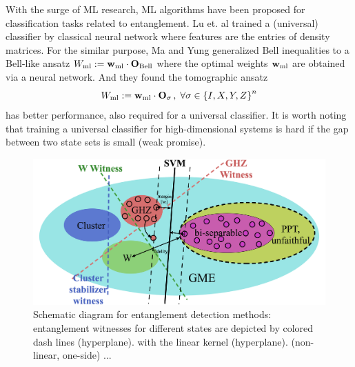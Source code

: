 \documentclass[
aps,
pra,
twocolumn,
floatfix,
]{revtex4-2}
\theoremstyle{plain}
\theoremstyle{definition}
\newcommand{\ew}{W}
\newcommand{\pob}{O}
\newcommand{\ml}{\text{ml}}
\newcommand{\bellineq}{\textup{Bell}}
\newcommand{\sx}{\hat{\sigma}_x}
\newcommand{\sy}{\hat{\sigma}_y}
\newcommand{\sz}{\hat{\sigma}_z}
\begin{document}
With the surge of ML research, ML algorithms have been proposed for classification tasks related to entanglement.
Lu et. al \cite{luSeparabilityEntanglementClassifierMachine2018} 
trained a (universal)  classifier by classical neural network
where features are the entries of density matrices.
For the similar purpose, Ma and Yung \cite{maTransformingBellInequalities2018} generalized Bell inequalities to a Bell-like ansatz $\ew_{\ml}:=\vbw_{\ml}\cdot\vb{\pob}_{\bellineq}$ where the optimal weights $\vbw_{\ml}$ are obtained via a neural network.
And they found the tomographic ansatz
\begin{equation}
	\ew_{\ml} := 
	\vbw_{\ml} \cdot \vb{\pob}_{\sigma} \, , \; \forall \sigma \in  \qty{I,X,Y,Z}^n
	\label{eq:tomographic_ansatz}
\end{equation}
has better performance, 
also required \cite{luTomographyNecessaryUniversal2016} for a universal  classifier.
It is worth noting that training a universal classifier for high-dimensional systems is hard if the gap between two state sets is small (weak promise).

\begin{figure}[!ht]
	\centering
		\centering
		\includegraphics[width=.9\linewidth]{schematic_entangle.png}
	\caption{Schematic diagram for entanglement detection methods: entanglement witnesses for different states are depicted by colored dash lines (hyperplane).  with the linear kernel (hyperplane).  (non-linear, one-side) ... }
	\label{fig:entangle}
\end{figure}
\end{document}

